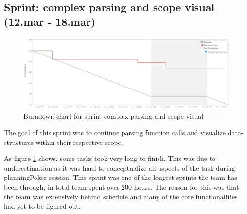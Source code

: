 \subsection{Sprint: complex parsing and scope visual (12.mar - 18.mar)}     \label{subsection:SprintComplexParsingAndScopeVisual}
\begin{figure}[H] 
    \includegraphics[width=\textwidth]{inc/images/sprints/sprintComplexParsingAndScopeVisual120319-180319.png}
    \caption{Burndown chart for sprint complex parsing and scope visual}
    \label{fig:sprintComplexParsingAndScopeVisual}
\end{figure}

The goal of this \gls{sprint} was to continue parsing function calls and visualize data-structures within their respective scope.

As figure \ref{fig:sprintComplexParsingAndScopeVisual} shows, some tasks took very long to finish. This was due to underestimation as it was hard to conceptualize all aspects of the task during \Gls{planningPoker} session. This \gls{sprint} was one of the longest \glspl{sprint} the team has been through, in total team spent over 200 hours. The reason for this was that the team was extensively behind schedule and many of the core functionalities had yet to be figured out.

